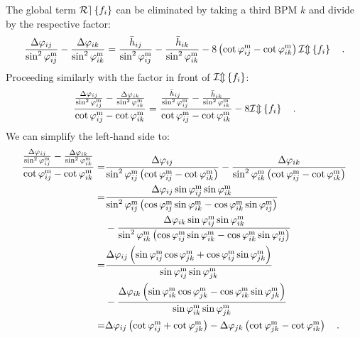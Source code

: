 The global term $\mathcal{Re} \left\{ f_i \right\}$ can be eliminated by taking a third BPM $k$ and divide by the respective factor:
%
\begin{equation}
	\frac{\Delta\varphi_{ij}}{\sin^2\varphi_{ij}^\text{m}} - \frac{\Delta\varphi_{ik}}{\sin ^2\varphi_{ik}^\text{m}}
  =
	\frac{
    \bar{h}_{ij}
  }{
    \sin^2\varphi_{ij}^\text{m}
  } -
  \frac{
    \bar{h}_{ik }
  }{
    \sin^2\varphi_{ik}^\text{m}
  }
  - 8\left(\cot\varphi_{ij}^\text{m} - \cot\varphi_{ik}^\text{m}\right)\mathcal{Im} \left\{ f_i \right\}
    \quad .
    \label{eq_Deltaphi_first_step}
\end{equation}
%
Proceeding similarly with the factor in front of $\mathcal{Im} \left\{ f_i \right\}$:
%
\begin{equation}
  \frac{
    \frac{\Delta\varphi_{ij}}{\sin^2\varphi_{ij}^\text{m}} - \frac{\Delta\varphi_{ik}}{\sin ^2\varphi_{ik}^\text{m}}
  }{
    \cot\varphi_{ij}^\text{m} - \cot\varphi_{ik}^\text{m} } =
  \frac{
    \frac{ \bar{h}_{ij} }{ \sin^2\varphi_{ij}^\text{m} } -
    \frac{ \bar{h}_{ik } }{ \sin^2\varphi_{ik}^\text{m} }
  }{
    \cot\varphi_{ij}^\text{m} - \cot\varphi_{ik}^\text{m}
  }
  - 8\mathcal{Im} \left\{ f_i \right\}
    \quad .
    \label{eq_Deltaphi_second_step}
\end{equation}
%
We can simplify the left-hand side to:
{
\small
%
\begin{align}
  \frac{
    \frac{\Delta\varphi_{ij}}{\sin^2\varphi_{ij}^\text{m}} - \frac{\Delta\varphi_{ik}}{\sin ^2\varphi_{ik}^\text{m}}
  }{
  \cot\varphi_{ij}^\text{m} - \cot\varphi_{ik}^\text{m} }
  =&  \frac{\Delta\varphi_{ij}}{
    \sin^2\varphi_{ij}^\text{m} \left( \cot\varphi_{ij}^\text{m} - \cot\varphi_{ik}^\text{m} \right)
  }
  -
  \frac{\Delta\varphi_{ik}}{
    \sin^2\varphi_{ik}^\text{m} \left( \cot\varphi_{ij}^\text{m} - \cot\varphi_{ik}^\text{m} \right)
  } \notag \\
  =&
  \frac{
    \Delta\varphi_{ij}\sin\varphi_{ij}^\text{m} \sin\varphi_{ik}^\text{m}
  }{
    \sin^2\varphi_{ij}^\text{m} \left( \cos\varphi_{ij}^\text{m} \sin\varphi_{ik}^\text{m} - \cos\varphi_{ik}^\text{m}\sin\varphi_{ij}^\text{m} \right)
  }\notag \\
  &-
  \frac{
    \Delta\varphi_{ik}\sin\varphi_{ij}^\text{m} \sin\varphi_{ik}^\text{m}
  }{
    \sin^2\varphi_{ik}^\text{m} \left( \cos\varphi_{ij}^\text{m} \sin\varphi_{ik}^\text{m} - \cos\varphi_{ik}^\text{m}\sin\varphi_{ij}^\text{m} \right)
  } \notag  \\
  =& 
  \frac{
    \Delta\varphi_{ij}\left( 
    \sin \varphi_{ij}^\text{m} \cos \varphi_{jk}^\text{m} + \cos \varphi_{ij}^\text{m} \sin\varphi_{jk}^\text{m}\right)
  }{
    \sin\varphi_{ij}^\text{m} \sin \varphi_{jk}^\text{m}
  } \notag \\
  &-
  \frac{
    \Delta\varphi_{ik}\left( 
    \sin \varphi_{ik}^\text{m} \cos \varphi_{jk}^\text{m} - \cos \varphi_{ik}^\text{m} \sin\varphi_{jk}^\text{m}\right)
  }{
    \sin\varphi_{ik}^\text{m} \sin \varphi_{jk}^\text{m}
  } \notag \\
  =&
  \Delta\varphi_{ij} \left( 
    \cot \varphi_{ij}^\text{m} + \cot\varphi_{jk}^\text{m}
  \right)
  -
  \Delta\varphi_{jk} \left( 
    \cot\varphi_{jk}^\text{m} - \cot\varphi_{ik}^\text{m}
  \right)
  \quad .
\end{align}
%
}
